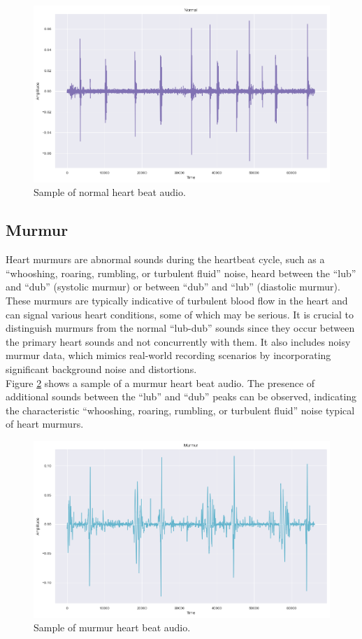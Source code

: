 \begin{figure}[H]
    \centering
    \includegraphics[width=.8\columnwidth]{../images/normal_heart_beat_audio.png}
    \caption{Sample of normal heart beat audio.}
    \label{fig:normal_heart_beat_audio}
\end{figure}
\noindent




\subsection{Murmur}
Heart murmurs are abnormal sounds during the heartbeat cycle, such as a ``whooshing, roaring, rumbling, or turbulent fluid'' noise, heard between
the ``lub'' and ``dub'' (systolic murmur) or between ``dub'' and ``lub'' (diastolic murmur).
These murmurs are typically indicative of turbulent blood flow in the heart and can signal various heart conditions, some of which may be serious.
It is crucial to distinguish murmurs from the normal ``lub-dub'' sounds since they occur between the primary heart sounds and not concurrently with them.
It also includes noisy murmur data, which mimics real-world recording scenarios by incorporating significant background noise and distortions.\\
Figure \ref{fig:murmur_heart_beat_audio} shows a sample of a murmur heart beat audio.
The presence of additional sounds between the ``lub'' and ``dub'' peaks can be observed, indicating the characteristic
``whooshing, roaring, rumbling, or turbulent fluid'' noise typical of heart murmurs.

\begin{figure}[H]
    \centering
    \includegraphics[width=.8\columnwidth]{../images/murmur_heart_beat_audio.png}
    \caption{Sample of murmur heart beat audio.}
    \label{fig:murmur_heart_beat_audio}
\end{figure}
\noindent


